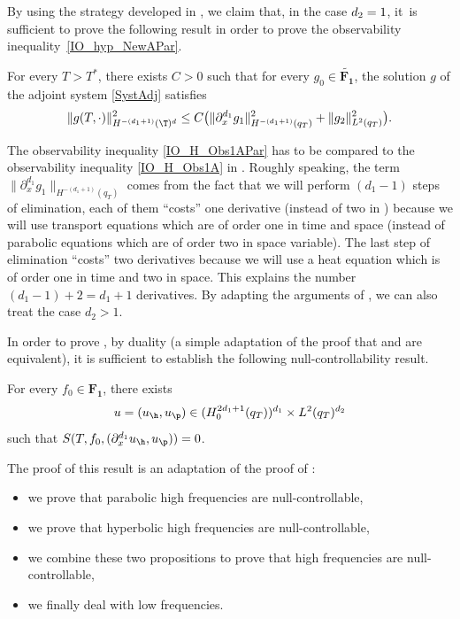 By using the strategy developed in , we claim that, in the case $d_2=\nobreak1$, it~is sufficient to prove the following result in order to prove the observability inequality~\eqref{IO_hyp_NewAPar}.
\begin{prop}\label{PropObs1APar}
For every $T>T^\ast$, there exists $C>0$ such that for every $g_0 \in \widetilde{\mathbf{F_1}}$, the solution $g$ of the adjoint system \eqref{SystAdj} satisfies
\begin{equation} \label{IO_H_Obs1APar}
\| g(T,\cdot) \|_{H^{-(d_1+1)}(\T)^{d}}^2 \leq C \bigl(\|\partial_x^{d_1} g_1\|_{H^{-(d_1+1)}(q_T)}^2 + \|g_2\|_{L^2(q_T)}^2 \bigr).
\end{equation}
\end{prop}
The observability inequality \eqref{IO_H_Obs1APar} has to be compared to the observability inequality \eqref{IO_H_Obs1A} in . Roughly speaking, the term $\|\partial_x^{d_1} g_1\|_{H^{-(d_1+1)}(q_T)}$ comes from the fact that we will perform $(d_1-1)$ steps of elimination, each of them “costs” one derivative (instead of two in ) because we will use transport equations which are of order one in time and space (instead of parabolic equations which are of order two in space variable). The last step of elimination “costs” two derivatives because we will use a heat equation which is of order one in time and two in space. This explains the number $(d_1-1)+2 = d_1+1$ derivatives. By adapting the arguments of , we can also treat the case $d_2>1$.

In order to prove , by duality (a simple adaptation of the proof that  and  are equivalent), it is sufficient to establish the following null-controllability result.
\begin{prop}\label{PropNullControldxPar}
For every $f_0 \in \mathbf{F_1}$, there exists
\[
u=(u_{\h},u_{\p}) \in (H_0^{2d_1+1}(q_T))^{d_1} \times L^2(q_T)^{d_2}
\]
such that $S(T, f_0, (\partial_x^{d_1} u_{\h},u_{\p})) = 0$.
\end{prop}

The proof of this result is an adaptation of the proof of :
\begin{itemize}
\item we prove that parabolic high frequencies are null-controllable,
\item we prove that hyperbolic high frequencies are null-controllable,
\item we combine these two propositions to prove that high frequencies are null-controllable,
\item we finally deal with low frequencies.
\end{itemize}

